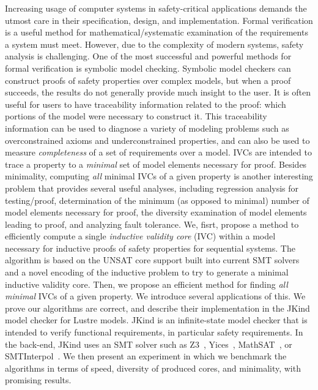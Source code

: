 Increasing usage of computer systems in safety-critical applications demands the utmost care in their specification, design, and implementation.  Formal verification is a useful method for mathematical/systematic examination of the requirements a system must meet. However, due to the complexity of modern systems, safety analysis is challenging. One of the most successful and powerful methods for formal verification is symbolic model checking.
Symbolic model checkers can construct proofs of safety properties over complex
models, but when a proof succeeds, the results do not generally provide much
insight to the user. It is often useful for users to have traceability information related to the proof: which portions of the model were necessary to construct it.  This traceability information can be used to diagnose a variety of modeling problems such as overconstrained axioms and underconstrained properties, and can also be used to measure {\em completeness} of a set of requirements over a model.  
IVCs are intended to trace a property to a \emph{minimal} set of model elements necessary for proof. Besides minimality, computing \emph{all} minimal IVCs of a given property is
another interesting problem that provides several useful analyses, including
regression analysis for testing/proof, determination of the minimum (as
opposed to minimal) number of model elements necessary for proof, the
diversity examination of model elements leading to proof, and analyzing fault
tolerance.
We, fisrt, propose a method to efficiently compute a single {\em inductive validity core} (IVC) within a model necessary for inductive proofs of safety properties for sequential systems.  The algorithm is based on the UNSAT core support built into current SMT solvers and a novel encoding of the inductive problem to try to generate a minimal inductive validity core.
Then, we propose an efficient method for finding \emph{all minimal} IVCs of a
given property. We introduce several applications of this. We prove our algorithms are correct, and describe their implementation in the JKind model checker for Lustre models.  
 JKind is an infinite-state model checker that is intended to verify functional requirements, in particular safety requirements. In the back-end, JKind uses an SMT solver such as Z3~\cite{DeMoura08:z3}, Yices~\cite{Dutertre06:yices}, MathSAT~\cite{Cimatti2013:MathSAT}, or SMTInterpol~\cite{Christ2012:SMTInterpol}.
We then present an experiment in which we benchmark the algorithms in terms of speed, diversity of produced cores, and minimality, with promising results.
